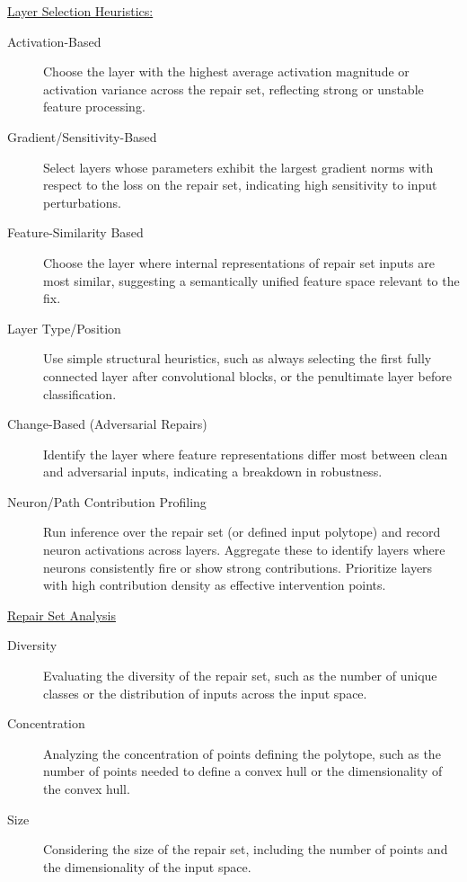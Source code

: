 \documentclass{article}
\begin{document}
\underline{Layer Selection Heuristics:}
\begin{description}
	\item[Activation-Based] Choose the layer with the highest average activation magnitude or activation variance across the repair set, reflecting strong or unstable feature processing.
	\item[Gradient/Sensitivity-Based] Select layers whose parameters exhibit the largest gradient norms with respect to the loss on the repair set, indicating high sensitivity to input perturbations.
	\item[Feature-Similarity Based] Choose the layer where internal representations of repair set inputs are most similar, suggesting a semantically unified feature space relevant to the fix.
	\item[Layer Type/Position] Use simple structural heuristics, such as always selecting the first fully connected layer after convolutional blocks, or the penultimate layer before classification.
	\item[Change-Based (Adversarial Repairs)] Identify the layer where feature representations differ most between clean and adversarial inputs, indicating a breakdown in robustness.
	\item[Neuron/Path Contribution Profiling] Run inference over the repair set (or defined input polytope) and record neuron activations across layers. Aggregate these to identify layers where neurons consistently fire or show strong contributions. Prioritize layers with high contribution density as effective intervention points.
\end{description}

\underline{Repair Set Analysis}
\begin{description}
	\item[Diversity] Evaluating the diversity of the repair set, such as the number of unique classes or the distribution of inputs across the input space.
	\item[Concentration] Analyzing the concentration of points defining the polytope, such as the number of points needed to define a convex hull or the dimensionality of the convex hull.
	\item[Size] Considering the size of the repair set, including the number of points and the dimensionality of the input space.
\end{description}
\end{document}
